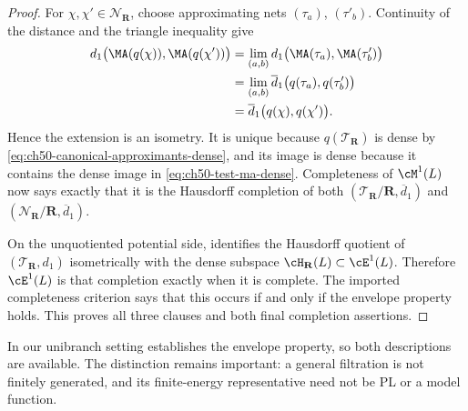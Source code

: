 \begin{proof}
For $\chi,\chi'\in\mathcal N_{\mathbf R}$, choose approximating nets
$(\tau_a)$, $(\tau'_b)$.  Continuity of the distance and the triangle
inequality give
\begin{align*}
 d_1\bigl(\MA(q(\chi)),\MA(q(\chi'))\bigr)
 &=\lim_{(a,b)}d_1\bigl(\MA(\tau_a),\MA(\tau'_b)\bigr)\\
 &=\lim_{(a,b)}\overline d_1\bigl(q(\tau_a),q(\tau'_b)\bigr)\\
 &=\overline d_1\bigl(q(\chi),q(\chi')\bigr).
\end{align*}
Hence the extension is an isometry.  It is unique because
$q(\mathcal T_{\mathbf R})$ is dense by
\eqref{eq:ch50-canonical-approximants-dense}, and its image is dense because
it contains the dense image in \eqref{eq:ch50-test-ma-dense}.  Completeness
of $\cM^1(L)$ now says exactly that it is the Hausdorff completion of both
$(\mathcal T_{\mathbf R}/\mathbf R,\overline d_1)$ and
$(\mathcal N_{\mathbf R}/\mathbf R,\overline d_1)$.

On the unquotiented potential side,
 identifies the Hausdorff quotient of
$(\mathcal T_{\mathbf R},d_1)$ isometrically with the dense subspace
$\cH_{\mathbf R}(L)\subset\cE^1(L)$.  Therefore $\cE^1(L)$ is that
completion exactly when it is complete.  The imported completeness
criterion \cite[Theorem~5.5(ii)]{BJKS1} says that this occurs if and only if
the envelope property holds.  This proves all three clauses and both final
completion assertions.
\end{proof}

In our unibranch setting
establishes the envelope property,
so both descriptions are available.  The distinction remains important:
a general filtration is not finitely generated, and its finite-energy
representative need not be PL or a model function.

